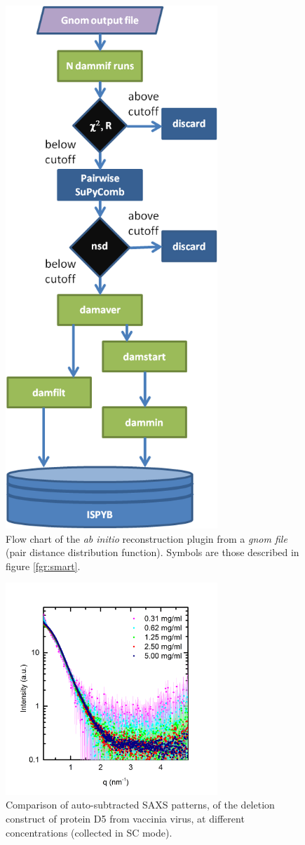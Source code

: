 \documentclass[preprint,pdf]{iucr}              %
\begin{document}
\begin{figure}
\centering
\includegraphics[width=8cm]{model.png}
\caption{Flow chart of the \textit{ab initio} reconstruction plugin from a
\textit{gnom file} (pair distance distribution function).
Symbols are those described in figure \ref{fgr:smart}.}\label{fgr:analysis}
\label{fgr:modelling}
\end{figure}

\begin{figure}
\centering
\includegraphics[width=8cm]{SCcurves.png}
\caption{Comparison of auto-subtracted SAXS patterns, of the deletion
construct of protein D5 from vaccinia virus, at different concentrations
(collected in SC mode).}
\label{fgr:SCcurves}
\end{figure}
\end{document}
